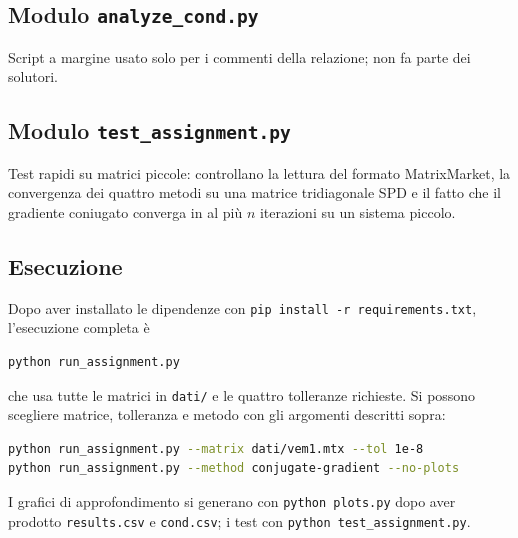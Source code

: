 \documentclass[11pt,a4paper]{article}
\begin{document}



\subsection{Modulo \texttt{analyze\_cond.py}}
Script a margine usato solo per i commenti della relazione; non fa parte dei
solutori.


\subsection{Modulo \texttt{test\_assignment.py}}
Test rapidi su matrici piccole: controllano la lettura del formato MatrixMarket,
la convergenza dei quattro metodi su una matrice tridiagonale SPD e il fatto che
il gradiente coniugato converga in al più $n$ iterazioni su un sistema piccolo.

\subsection{Esecuzione}
Dopo aver installato le dipendenze con \texttt{pip install -r requirements.txt},
l'esecuzione completa è
\begin{lstlisting}[language=bash]
python run_assignment.py
\end{lstlisting}
che usa tutte le matrici in \texttt{dati/} e le quattro tolleranze richieste. Si
possono scegliere matrice, tolleranza e metodo con gli argomenti descritti sopra:
\begin{lstlisting}[language=bash]
python run_assignment.py --matrix dati/vem1.mtx --tol 1e-8
python run_assignment.py --method conjugate-gradient --no-plots
\end{lstlisting}
I grafici di approfondimento si generano con \texttt{python plots.py} dopo aver
prodotto \texttt{results.csv} e \texttt{cond.csv}; i test con
\texttt{python test\_assignment.py}.
\end{document}

